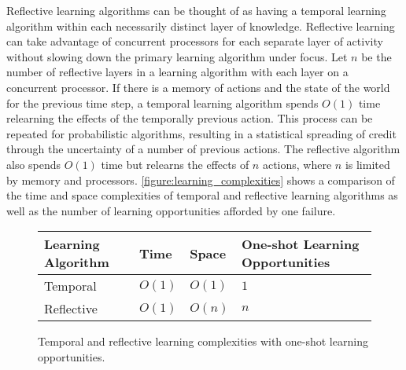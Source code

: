 Reflective learning algorithms can be thought of as having a temporal
learning algorithm within each necessarily distinct layer of
knowledge.  Reflective learning can take advantage of concurrent
processors for each separate layer of activity without slowing down
the primary learning algorithm under focus.  Let $n$ be the number of
reflective layers in a learning algorithm with each layer on a
concurrent processor.  If there is a memory of actions and the state
of the world for the previous time step, a temporal learning algorithm
spends $O(1)$ time relearning the effects of the temporally previous
action.  This process can be repeated for probabilistic algorithms,
resulting in a statistical spreading of credit through the uncertainty
of a number of previous actions.  The reflective algorithm also spends
$O(1)$ time but relearns the effects of $n$ actions, where $n$ is
limited by memory and processors.
{\mbox{\autoref{figure:learning_complexities}}} shows a comparison of
the time and space complexities of temporal and reflective learning
algorithms as well as the number of learning opportunities afforded by
one failure.
\begin{figure}
\center
\begin{tabular}{p{2cm}|p{2cm}|p{2cm}|p{3cm}}
Learning Algorithm & Time   & Space  & One-shot Learning Opportunities \\ \hline
Temporal           & $O(1)$ & $O(1)$ & $1$ \\
Reflective         & $O(1)$ & $O(n)$ & $n$ \\
\end{tabular}
\caption{Temporal and reflective learning complexities with one-shot learning opportunities.}
\label{figure:learning_complexities}
\end{figure}



